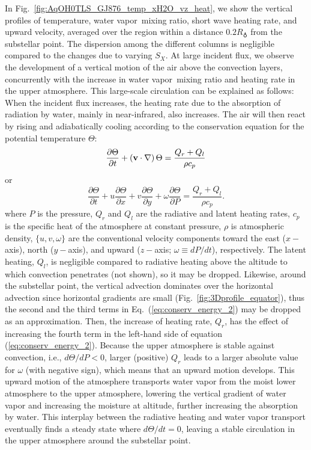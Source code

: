 \documentclass[11pt,numberedappendix,twocolappendix,]{emulateapj}
\newcommand{\wv}{{\color{orange}water vapor\ }}
\begin{document}
In Fig.~\ref{fig:AqOH0TLS_GJ876_temp_xH2O_vz_heat}, we show the vertical profiles of temperature, \wv mixing ratio, short wave heating rate, and upward velocity, averaged over the region within a distance $0.2R_\earth$ from the substellar point. 
The dispersion among the different columns is negligible compared to the changes due to varying $S_X$. 
At large incident flux, we observe the development of a vertical motion of the air above the convection layers, concurrently with the increase in \wv mixing ratio and heating rate in the upper atmosphere. 
This large-scale circulation can be explained as follows: When the incident flux increases, the heating rate due to the absorption of radiation by water, mainly in near-infrared, also increases. 
The air will then react by rising and adiabatically cooling according to the conservation equation for the potential temperature $\Theta $:
\begin{equation}
\frac{\partial \Theta }{\partial t} + ( {\bf v} \cdot \nabla ) \, \Theta = \frac{ Q_r + Q_l }{\rho c_p} \label{eq:conserv_energy}
\end{equation}
or
\begin{equation}
\frac{\partial \Theta }{\partial t} + u \frac{\partial \Theta }{\partial x} + v\frac{\partial \Theta }{\partial y} + \omega \frac{\partial \Theta }{\partial P} = \frac{ Q_r + Q_l }{\rho c_p}. \label{eq:conserv_energy_2}
\end{equation}
where $P$ is the pressure, $Q_r$ and $Q_l$ are the radiative and latent heating rates, $c_p$ is the specific heat of the atmosphere at constant pressure, $\rho $ is atmospheric density, $\{ u, v, \omega \}$ are the conventional velocity components toward the east ($x-$axis), north ($y-$axis), and upward ($z-$axis; $\omega \equiv dP/dt$), respectively. 
The latent heating, $Q_l$, is negligible compared to radiative heating above the altitude to which convection penetrates (not shown), so it may be dropped. 
Likewise, around the substellar point, the vertical advection dominates over the horizontal advection since horizontal gradients are small (Fig.~\ref{fig:3Dprofile_equator}), thus the second and the third terms in Eq.~(\ref{eq:conserv_energy_2}) may be dropped as an approximation. 
Then, the increase of heating rate, $Q_r$, has the effect of increasing the fourth term in the left-hand side of equation (\ref{eq:conserv_energy_2}). 
Because the upper atmosphere is stable against convection, i.e., $d \Theta / d P < 0 $, larger (positive) $Q_r$ leads to a larger absolute value for $\omega $ (with negative sign), which means that an upward motion develops. 
This upward motion of the atmosphere transports water vapor from the moist lower atmosphere to the upper atmosphere, lowering the vertical gradient of water vapor and increasing the moisture at altitude, further increasing the absorption by water. 
This interplay between the radiative heating and water vapor transport eventually finds a steady state where $d\Theta/dt = 0$, leaving a stable circulation in the upper atmosphere around the substellar point. 
\end{document}
